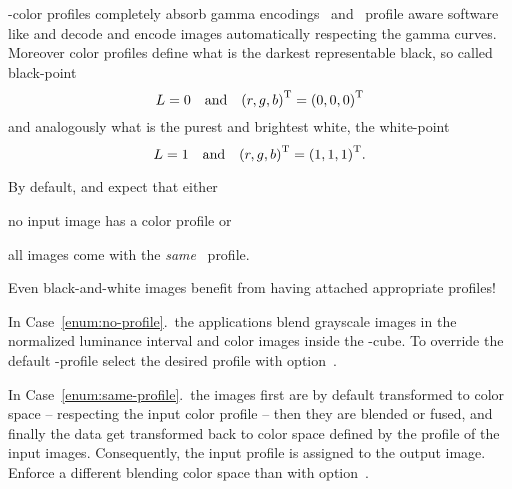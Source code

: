 %
%
%
%
-color profiles completely absorb gamma
encodings~ and ~profile aware software like
\App{} and \OtherApp{} decode and encode images automatically respecting the gamma curves.
Moreover color profiles define what is the darkest representable black, so called black-point
\[
  L = 0
  \quad \mbox{and}\quad
  {(r, g, b)}^{\mathrm{T}} = {(0, 0, 0)}^{\mathrm{T}}
\]
and analogously what is the purest and brightest white, the white-point
\[
  L = 1
  \quad \mbox{and}\quad
  {(r, g, b)}^{\mathrm{T}} = {(1, 1, 1)}^{\mathrm{T}}.
\]

\noindent By default, \App{} and \OtherApp{} expect that either

\begin{compactenumerate}
\item\label{enum:no-profile}
  no input image has a color profile or
\item\label{enum:same-profile}
  all images come with the \emph{same} ~profile.
\end{compactenumerate}

%
%
Even black-and-white images benefit from having attached appropriate profiles!

%
%
%
%
In Case~\ref{enum:no-profile}.\ the applications blend grayscale images in the normalized
luminance interval and color images inside the -cube.  To override the default
-profile select the desired profile with
option~.

In Case~\ref{enum:same-profile}.\ the images first are by default transformed to
 color space -- respecting the input color profile --
then they are blended or fused, and finally the data get transformed back to  color
space defined by the profile of the input images.  Consequently, the input profile is assigned
to the output image.  Enforce a different blending color space than  with
option~.

